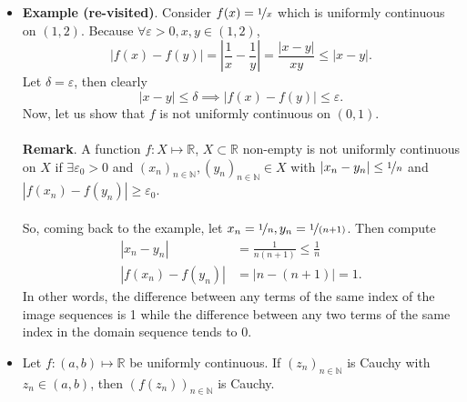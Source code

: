 \documentclass{article}
\newcommand{\R}{\mathbb{R}}
\newcommand{\N}{\mathbb{N}}
\newcommand{\seq}[2]{(#1_{#2})_{#2 \in \N}}
\newcommand{\?}{\stackrel{?}{=}}
\theoremstyle{definition} %
\begin{document}
\begin{itemize}
\begin{proof}
              $$|x - x_0| \leq \delta \implies |f(x) - f(x_0)| \leq \varepsilon.$$
              Since $f$ is assumed to be uniformly continuous, we know that $\forall \widetilde{\varepsilon} > 0 \ \exists \widetilde{\delta} = \widetilde{\delta}(\widetilde{\varepsilon})$ such that
              $$|x - y| \leq \widetilde{\varepsilon} \implies |f(x) - f(y)| \leq \widetilde{\varepsilon}.$$
              Then let $\varepsilon > 0$ be given. Let $\widetilde{\varepsilon} = \varepsilon$ and $\widetilde{\delta} = \widetilde{\delta}(\widetilde{\varepsilon})$ and write uniformly continuous for $y = x_0$. Then
              $$|x - x_0| \leq \widetilde{\delta} \implies |f(x) - f(x_0)| \leq \widetilde{\varepsilon} = \varepsilon.$$
              It suffices to take $\delta = \widetilde{\delta}$.
          \end{proof}
    \item \textbf{Example (re-visited)}. Consider $f(x) = \nicefrac{1}{x}$ which is uniformly continuous on $(1, 2)$. Because $\forall \varepsilon > 0, x, y \in (1, 2)$,
          $$|f(x) - f(y)| = \left| \frac{1}{x} - \frac{1}{y}\right| = \frac{|x - y|}{xy} \leq |x - y|.$$
          Let $\delta = \varepsilon$, then clearly
          $$|x - y| \leq \delta \implies |f(x) - f(y)| \leq \varepsilon.$$
          Now, let us show that $f$ is not uniformly continuous on $(0, 1).$ \\\\
          \textbf{Remark}. A function $f: X \mapsto \R$, $X \subset \R$ non-empty is not uniformly continuous on $X$ if $\exists \varepsilon_0 > 0$ and $\seq{x}{n}, \seq{y}{n} \in X$ with $|x_n - y_n| \leq \nicefrac{1}{n}$ and $|f(x_n) - f(y_n)| \geq \varepsilon_0$. \\\\
          So, coming back to the example, let $x_n = \nicefrac{1}{n}, y_n = \nicefrac{1}{(n + 1)}$. Then compute
          \begin{align*}
              |x_n - y_n|       & = \frac{1}{n(n + 1)} \leq \frac{1}{n} \\
              |f(x_n) - f(y_n)| & = |n - (n + 1)| = 1.
          \end{align*}
          In other words, the difference between any terms of the same index of the image sequences is 1 while the difference between any two terms of the same index in the domain sequence tends to 0.
    \item[]
          \begin{proposition}
              Let $f: (a, b) \mapsto \R$ be uniformly continuous. If $\seq{z}{n}$ is Cauchy with $z_n \in (a, b)$, then $(f(z_n))_{n \in \N}$ is Cauchy.

\end{proposition}
\end{itemize}
\end{document}
